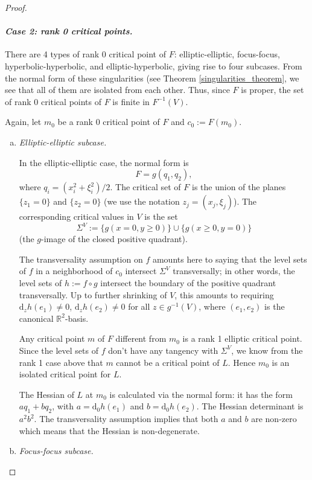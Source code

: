 \documentclass[11pt]{article}
\newcommand{\DD}{\mathrm{d}}
\newcommand{\RM}{\mathbb{R}}
\renewcommand{\geq}{\geqslant}
\begin{document}
\begin{proof}
\paragraph{\emph{Case 2: rank 0 critical points.}}
There are 4 types of rank 0 critical point of $F$: elliptic-elliptic,
focus-focus, hyperbolic-hyperbolic, and elliptic-hyperbolic, giving
rise to four subcases.  From the normal form of these singularities
(see Theorem \ref{singularities_theorem}, we see that all of them are
isolated from each other. Thus, since $F$ is proper, the set of rank 0
critical points of $F$ is finite in $F^{-1}(V)$.

Again, let $m_0$ be a rank 0 critical point of $F$ and $c_0:=F(m_0)$.

\begin{enumerate}[(a)]

\item{ \emph{Elliptic-elliptic subcase.}}

  In the elliptic-elliptic case, the normal form is
  \[
  F=g(q_1,q_2),
  \]
  where $q_i=(x_i^2+\xi_i^2)/2$.  The critical set of $F$ is the union
  of the planes $\{z_1=0\}$ and $\{z_2=0\}$ (we use the notation
  $z_j=(x_j,\xi_j)$). The corresponding critical values in $V$ is the
  set
$$
\Sigma^V:=\{g(x=0,y\geq 0)\}\cup\{g(x\geq 0,y=0)\}
$$ 
(the $g$-image of the closed positive quadrant).
 
The transversality assumption on $f$ amounts here to saying that the
level sets of $f$ in a neighborhood of $c_0$ intersect $\Sigma^V$
transversally; in other words, the level sets of $h:=f\circ g$
intersect the boundary of the positive quadrant transversally. Up to
further shrinking of $V$, this amounts to requiring $\DD_z h(e_1)\neq
0$, $\DD_z h(e_2)\neq 0$ for all $z\in g^{-1}(V)$, where $(e_1,e_2)$
is the canonical $\RM^2$-basis.


Any critical point $m$ of $F$ different from $m_0$ is a rank 1
elliptic critical point.  Since the level sets of $f$ don't have any
tangency with $\Sigma^V$, we know from the rank 1 case above that $m$
cannot be a critical point of $L$. Hence $m_0$ is an isolated critical
point for $L$.

The Hessian of $L$ at $m_0$ is calculated via the normal form: it has
the form $aq_1+bq_2$, with $a=\DD_0h(e_1)$ and $b=\DD_0 h(e_2)$.  The
Hessian determinant is $a^2b^2$. The transversality assumption implies
that both $a$ and $b$ are non-zero which means that the Hessian is
non-degenerate.

\item{\emph{Focus-focus subcase.}}


\end{enumerate}
\end{proof}
\end{document}
